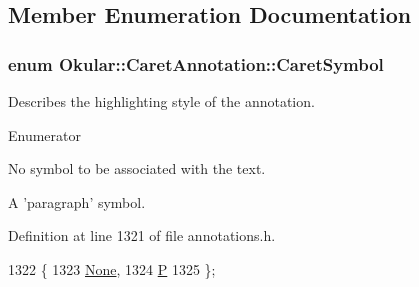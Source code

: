 \subsection{Member Enumeration Documentation}
\hypertarget{classOkular_1_1CaretAnnotation_a0fa75d6ac84d6e08aae0561b55e98695}{
\subsubsection[{Caret\+Symbol}]{\setlength{\rightskip}{0pt plus 5cm}enum {\bf Okular\+::\+Caret\+Annotation\+::\+Caret\+Symbol}}}\label{classOkular_1_1CaretAnnotation_a0fa75d6ac84d6e08aae0561b55e98695}
Describes the highlighting style of the annotation. \begin{Desc}
\item[Enumerator]\par
\begin{description}
\item[{\em 
\hypertarget{classOkular_1_1CaretAnnotation_a0fa75d6ac84d6e08aae0561b55e98695aac987216c2d46c031053ac96718c05ee}{None}\label{classOkular_1_1CaretAnnotation_a0fa75d6ac84d6e08aae0561b55e98695aac987216c2d46c031053ac96718c05ee}
}]No symbol to be associated with the text. \item[{\em 
\hypertarget{classOkular_1_1CaretAnnotation_a0fa75d6ac84d6e08aae0561b55e98695a18d3f68c9167d4db0fd70b5d869c813a}{P}\label{classOkular_1_1CaretAnnotation_a0fa75d6ac84d6e08aae0561b55e98695a18d3f68c9167d4db0fd70b5d869c813a}
}]A 'paragraph' symbol. \end{description}
\end{Desc}


Definition at line 1321 of file annotations.\+h.


\begin{DoxyCode}
1322         \{
1323             \hyperlink{classOkular_1_1CaretAnnotation_a0fa75d6ac84d6e08aae0561b55e98695aac987216c2d46c031053ac96718c05ee}{None},       
1324             \hyperlink{classOkular_1_1CaretAnnotation_a0fa75d6ac84d6e08aae0561b55e98695a18d3f68c9167d4db0fd70b5d869c813a}{P}           
1325         \};
\end{DoxyCode}


